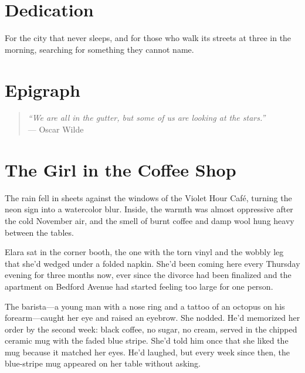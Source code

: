 \documentclass[
    language=english,
    doctype=novel,
    institution=none,
]{../../omnilatex}
\begin{document}
\maketitle

\frontmatter

\chapter{Dedication}

For the city that never sleeps, and for those who walk its streets at three in the morning, searching for something they cannot name.

\chapter{Epigraph}

\begin{quote}
\textit{``We are all in the gutter, but some of us are looking at the stars.''}\\
--- Oscar Wilde
\end{quote}

\tableofcontents

\mainmatter

\chapter{The Girl in the Coffee Shop}

The rain fell in sheets against the windows of the Violet Hour Café, turning the neon sign into a watercolor blur. Inside, the warmth was almost oppressive after the cold November air, and the smell of burnt coffee and damp wool hung heavy between the tables.

Elara sat in the corner booth, the one with the torn vinyl and the wobbly leg that she'd wedged under a folded napkin. She'd been coming here every Thursday evening for three months now, ever since the divorce had been finalized and the apartment on Bedford Avenue had started feeling too large for one person.

The barista---a young man with a nose ring and a tattoo of an octopus on his forearm---caught her eye and raised an eyebrow. She nodded. He'd memorized her order by the second week: black coffee, no sugar, no cream, served in the chipped ceramic mug with the faded blue stripe. She'd told him once that she liked the mug because it matched her eyes. He'd laughed, but every week since then, the blue-stripe mug appeared on her table without asking.
\end{document}
